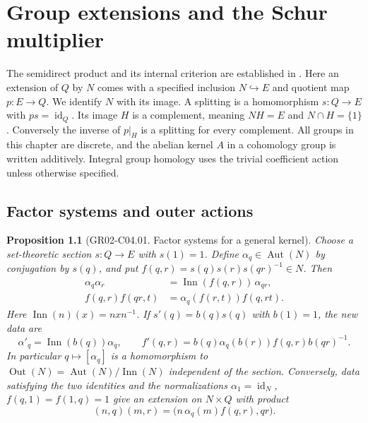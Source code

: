 \documentclass[11pt,oneside,openany]{book}
\newtheorem{proposition}[theorem]{Proposition}
\theoremstyle{definition}
\theoremstyle{remark}
\begin{document}
\chapter{Group extensions and the Schur multiplier}
\label{ch:gr02-extensions}

The semidirect product and its internal criterion are established
in \cite[K07.04.semidirect\_product and K07.04.semidirect\_recognition]{d07}.
Here an extension of \(Q\) by \(N\) comes with a specified
inclusion \(N\hookrightarrow E\) and quotient map \(p:E\to Q\).
We identify \(N\) with its image. A splitting is a homomorphism
\(s:Q\to E\) with \(ps=\operatorname{id}_Q\). Its image \(H\) is a
complement, meaning \(NH=E\) and \(N\cap H=\{1\}\). Conversely the
inverse of \(p|_H\) is a splitting for every complement. All groups
in this chapter are discrete, and the abelian kernel \(A\) in a
cohomology group is written additively. Integral group homology
uses the trivial coefficient action unless otherwise specified.

\section{Factor systems and outer actions}

\begin{proposition}[GR02-C04.01. Factor systems for a general kernel]
\label{prop:gr02-factor-system}
Choose a set-theoretic section \(s:Q\to E\) with \(s(1)=1\).
Define \(\alpha_q\in\operatorname{Aut}(N)\) by conjugation by \(s(q)\),
and put \(f(q,r)=s(q)s(r)s(qr)^{-1}\in N\). Then
\begin{align*}
 \alpha_q\alpha_r &=\operatorname{Inn}(f(q,r))\,\alpha_{qr},\\
 f(q,r)f(qr,t)&=\alpha_q(f(r,t))f(q,rt).
\end{align*}
Here \(\operatorname{Inn}(n)(x)=nxn^{-1}\). If \(s'(q)=b(q)s(q)\)
with \(b(1)=1\), the new data are
\[
 \alpha'_q=\operatorname{Inn}(b(q))\alpha_q,\qquad
 f'(q,r)=b(q)\alpha_q(b(r))f(q,r)b(qr)^{-1}.
\]
In particular \(q\mapsto[\alpha_q]\) is a homomorphism
to \(\operatorname{Out}(N)=\operatorname{Aut}(N)/\operatorname{Inn}(N)\)
independent of the section. Conversely, data satisfying the two
identities and the normalizations
\(\alpha_1=\operatorname{id}_N\), \(f(q,1)=f(1,q)=1\)
give an extension on \(N\times Q\) with product
\[
 (n,q)(m,r)=\bigl(n\,\alpha_q(m)f(q,r),qr\bigr).
\]
\end{proposition}
\end{document}
